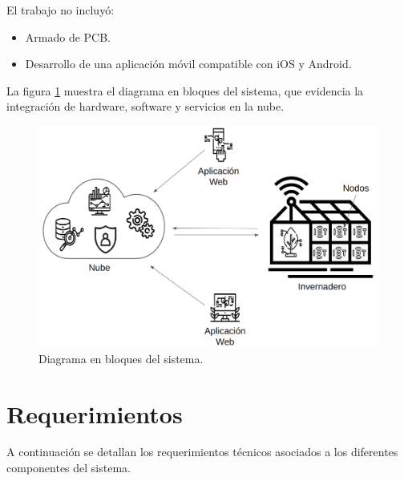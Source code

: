 El trabajo no incluyó:
\begin{itemize}
      \item Armado de PCB.
      \item Desarrollo de una aplicación móvil compatible con iOS y Android.
\end{itemize}

\hspace{1cm}

La figura \ref{fig:diagBloques} muestra el diagrama en bloques del sistema, que
evidencia la integración de hardware, software y servicios en la nube.

\begin{figure}[htpb]
      \centering
      \includegraphics[width=.90\textwidth]{./Images/1.png}
      \caption{Diagrama en bloques del sistema.}
      \label{fig:diagBloques}
\end{figure}


\section{Requerimientos}

A continuación se detallan los requerimientos técnicos asociados a los
diferentes componentes del sistema.

